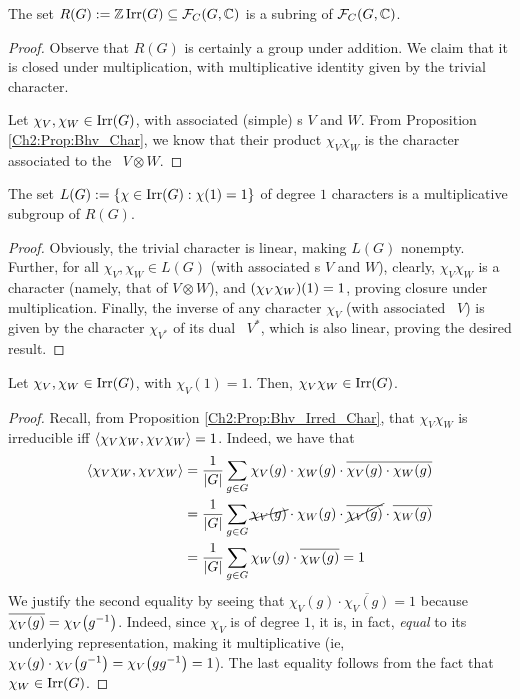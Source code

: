 \begin{lemma}
    The set $R(G) := \mathbb{Z} \operatorname{Irr}\!\left( G \right) \subseteq \mathcal{F}_C\!\left( G, \mathbb{C} \right)$ is a subring of $\mathcal{F}_C\!\left( G, \mathbb{C} \right)$.
\end{lemma}
\begin{proof}
    Observe that $R(G)$ is certainly a group under addition. We claim that it is closed under multiplication, with multiplicative identity given by the trivial character.
    
    Let $\chi_V, \chi_W \in \operatorname{Irr}\!\left( G \right)$, with associated (simple) \CGM s $V$ and $W$. From Proposition \ref{Ch2:Prop:Bhv_Char}, we know that their product $\chi_V \chi_W$ is the character associated to the \CGM\ $V \otimes W$. %
\end{proof}

\begin{corollary}
    The set $L(G) := \left\{ \chi \in \operatorname{Irr}\!\left( G \right) : \chi(1) = 1 \right\}$ of degree $1$ characters is a multiplicative subgroup of $R(G)$.
\end{corollary}
\begin{proof}
    Obviously, the trivial character is linear, making $L(G)$ nonempty. Further, for all $\chi_V, \chi_W \in L(G)$ (with associated \CGM s $V$ and $W$), clearly, $\chi_V \chi_W$ is a character (namely, that of $V \otimes W$), and $\left( \chi_V\chi_W \right)\!(1) = 1$, proving closure under multiplication. Finally, the inverse of any character $\chi_V$ (with associated \CGM\ $V$) is given by the character $\chi_{V^*}$ of its dual \CGM\ $V^*$, which is also linear, proving the desired result.
\end{proof}

\begin{lemma}
    Let $\chi_V, \chi_W \in \operatorname{Irr}\!\left( G \right)$, with $\chi_V(1) = 1$. Then, $\chi_V \chi_W \in \operatorname{Irr}\!\left( G \right)$.
\end{lemma}
\begin{proof}
    Recall, from Proposition \ref{Ch2:Prop:Bhv_Irred_Char}, that $\chi_V \chi_W$ is irreducible iff $\left\langle \chi_V \chi_W, \chi_V \chi_W \right\rangle = 1$. Indeed, we have that
    \begin{align*}
        \left\langle \chi_V \chi_W, \chi_V \chi_W \right\rangle &= \frac{1}{\left\lvert G \right\rvert} \sum_{g \in G} \chi_V(g) \cdot \chi_W(g) \cdot \overline{\chi_V(g) \cdot \chi_W(g)} \\
        &= \frac{1}{\left\lvert G \right\rvert} \sum_{g \in G} \cancel{\chi_V(g)} \cdot \chi_W(g) \cdot \cancel{\overline{\chi_V(g)}} \cdot \overline{\chi_W(g)} \\
        &= \frac{1}{\left\lvert G \right\rvert} \sum_{g \in G} \chi_W(g) \cdot \overline{\chi_W(g)} = 1
    \end{align*}
    We justify the second equality by seeing that $\chi_V(g) \cdot \overline{\chi_V(g)} = 1$ because $\overline{\chi_V(g)} = \chi_V\!\left( g^{-1} \right)$. Indeed, since $\chi_V$ is of degree $1$, it is, in fact, \textit{equal} to its underlying representation, making it multiplicative (ie, $\chi_{V}\!\left( g \right) \cdot \chi_{V}\!\left( g^{-1} \right) = \chi_{V}\!\left( g g^{-1} \right) = 1$). The last equality follows from the fact that $\chi_W \in \operatorname{Irr}\!\left( G \right)$.
\end{proof}